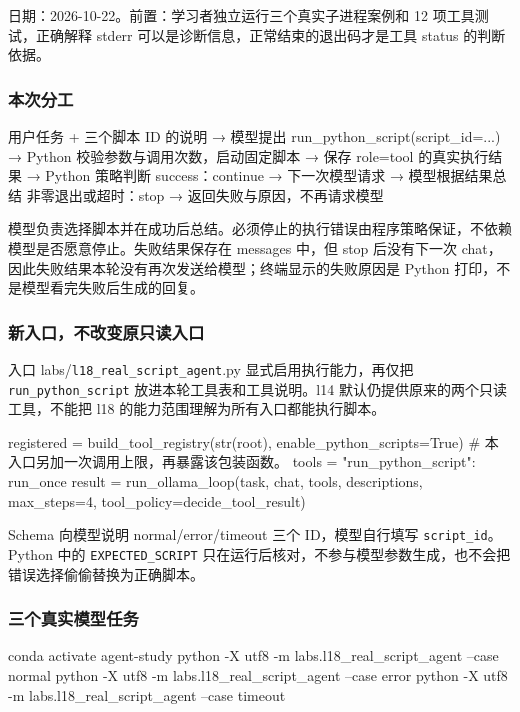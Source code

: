 \documentclass[UTF8,zihao=-4,fontset=fandol]{ctexart}
\begin{document}
日期：2026-10-22。前置：学习者独立运行三个真实子进程案例和 12 项工具测试，正确解释 stderr 可以是诊断信息，正常结束的退出码才是工具 status 的判断依据。

\subsubsection{本次分工}

\begin{Code}
用户任务 + 三个脚本 ID 的说明
  → 模型提出 run_python_script(script_id=...)
  → Python 校验参数与调用次数，启动固定脚本
  → 保存 role=tool 的真实执行结果
  → Python 策略判断
      success：continue → 下一次模型请求 → 模型根据结果总结
      非零退出或超时：stop → 返回失败与原因，不再请求模型
\end{Code}

模型负责选择脚本并在成功后总结。必须停止的执行错误由程序策略保证，不依赖模型是否愿意停止。失败结果保存在 messages 中，但 stop 后没有下一次 chat，因此失败结果本轮没有再次发送给模型；终端显示的失败原因是 Python 打印，不是模型看完失败后生成的回复。

\subsubsection{新入口，不改变原只读入口}

入口 labs/\nolinkurl{l18_real_script_agent}.py 显式启用执行能力，再仅把 \nolinkurl{run_python_script} 放进本轮工具表和工具说明。l14 默认仍提供原来的两个只读工具，不能把 l18 的能力范围理解为所有入口都能执行脚本。

\begin{Code}
registered = build_tool_registry(str(root), enable_python_scripts=True)
# 本入口另加一次调用上限，再暴露该包装函数。
tools = {"run_python_script": run_once}
result = run_ollama_loop(task, chat, tools, descriptions,
                         max_steps=4, tool_policy=decide_tool_result)
\end{Code}

Schema 向模型说明 normal/error/timeout 三个 ID，模型自行填写 \nolinkurl{script_id}。Python 中的 \nolinkurl{EXPECTED_SCRIPT} 只在运行后核对，不参与模型参数生成，也不会把错误选择偷偷替换为正确脚本。

\subsubsection{三个真实模型任务}

\begin{Code}
conda activate agent-study
python -X utf8 -m labs.l18_real_script_agent --case normal
python -X utf8 -m labs.l18_real_script_agent --case error
python -X utf8 -m labs.l18_real_script_agent --case timeout
\end{Code}
\end{document}
